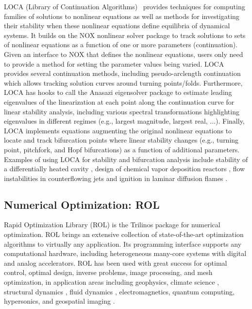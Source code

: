 LOCA (Library of Continuation Algorithms)~\cite{Salinger2005}
provides techniques for computing families of solutions to nonlinear equations as well as methods for investigating their stability when these nonlinear equations define equilibria of dynamical systems.  It builds on the NOX nonlinear solver package to track solutions to sets of nonlinear equations as a function of one or more parameters (continuation).
Given an interface to NOX that defines the nonlinear equations, users only need to provide a method for setting the parameter values being varied.
LOCA provides several continuation methods, including pseudo-arclength continuation which allows tracking solution curves around turning points/folds.  Furthermore, LOCA has hooks to call the Anasazi eigensolver package to estimate leading eigenvalues of the linearization at each point along the continuation curve for linear stability analysis, including various spectral transformations highlighting eigenvalues in different regimes (e.g., largest magnitude, largest real, ...).  Finally, LOCA implements equations augmenting the original nonlinear equations to locate and track bifurcation points where linear stability changes (e.g., turning point, pitchfork, and Hopf bifurcations) as a function of additional parameters. Examples of using LOCA for stability and bifurcation analysis include stability of a differentially heated cavity \cite{Salinger2002}, design of chemical vapor deposition reactors \cite{Pawlowski2001}, flow instabilities in counterflowing jets \cite{pawlowski_salinger_shadid_mountziaris_2006} and ignition in laminar diffusion flames \cite{Shadid20061846}.



\subsection{Numerical Optimization: ROL}
Rapid Optimization Library (ROL) \cite{rol,ROL2022ICCOPT} is the
Trilinos package for numerical optimization. ROL brings an extensive
collection of state-of-the-art optimization algorithms to virtually
any application. Its programming interface supports any computational
hardware, including heterogeneous many-core systems with digital and
analog accelerators.
ROL has been used with great success for optimal control, optimal design,
inverse problems, image processing, and mesh optimization, in application
areas including geophysics, climate science \cite{Perego2022}, structural
dynamics \cite{AQUINO2019323,BUNTING2021107295}, fluid dynamics
\cite{Antil2023}, electromagnetics, quantum computing, hypersonics, and
geospatial imaging \cite{Kouri2014}.

